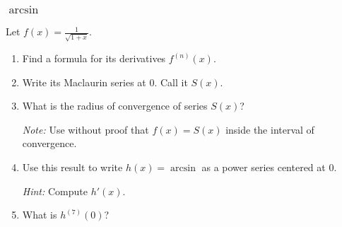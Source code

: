 \documentclass[14pt]{beamer}
\begin{document}
	\begin{frame}[t]
		\frametitle{$\arcsin$}

		Let $\displaystyle f(x)=\frac{1}{\sqrt{1+x}}$.
		\begin{enumerate}
			\item Find a formula for its derivatives $\displaystyle f^{(n)}(x)$.
				\vspace{.2cm}

			\item Write its Maclaurin series at $0$. Call it $S(x)$.
				\vspace{.2cm}

			\item What is the radius of convergence of series $S(x)$?

				{\fontsize{12}{12}\selectfont \emph{Note:} Use without proof that $\displaystyle f(x)=S(x)$ inside the interval of convergence. }
				\vspace{.2cm}

			\item Use this result to write $h(x) = \arcsin$ as a power series centered
				at $0$.

				{\fontsize{12}{12}\selectfont \emph{Hint:} Compute $\displaystyle h'(x)$. }
				\vspace{.2cm}

			\item What is $\displaystyle h^{(7)}(0)$?
		\end{enumerate}
	\end{frame}
\end{document}
